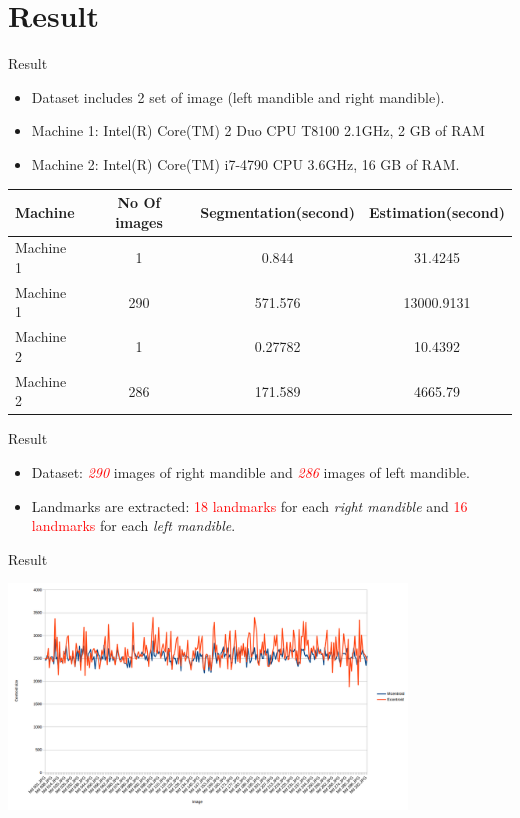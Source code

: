 \documentclass{beamer}
\begin{document}
\section{Result}
\begin{frame}{Result}
	\begin{itemize}
	\item Dataset includes 2 set of image (left mandible and right mandible).
	\item Machine 1: Intel(R) Core(TM) 2 Duo CPU T8100 2.1GHz, 2 GB of RAM
	\item Machine 2: Intel(R) Core(TM) i7-4790 CPU 3.6GHz, 16 GB of RAM.
	\end{itemize}	
	\begin{center}
				\begin{tabular}{|p{3cm}|c|c|c|}
					\hline
					Machine & No Of images & Segmentation(second) & Estimation(second) \\ \hline
					Machine 1 & 1 & 0.844 & 31.4245   \\ \hline
					Machine 1 & 290 & 571.576 & 13000.9131   \\ \hline
					Machine 2 & 1 & 0.27782 & 10.4392 \\ \hline
					Machine 2 & 286 & 171.589 & 4665.79 \\ \hline
				\end{tabular}
			\end{center}
\end{frame}
\fi
\begin{frame}{Result}
	\begin{itemize}
		\item Dataset: \textit{\textcolor{red}{290}} images of right mandible and \textit{\textcolor{red}{286}} images of left mandible.
		\item Landmarks are extracted: \textcolor{red}{18 landmarks} for each \textit{right mandible} and \textcolor{red}{16 landmarks} for each \textit{left mandible}.
	\end{itemize}
\end{frame}
\begin{frame}{Result}
	\begin{center}
		\includegraphics[height=6cm]{images/MdChart.png}	
	\end{center}
\end{frame}
\end{document}
